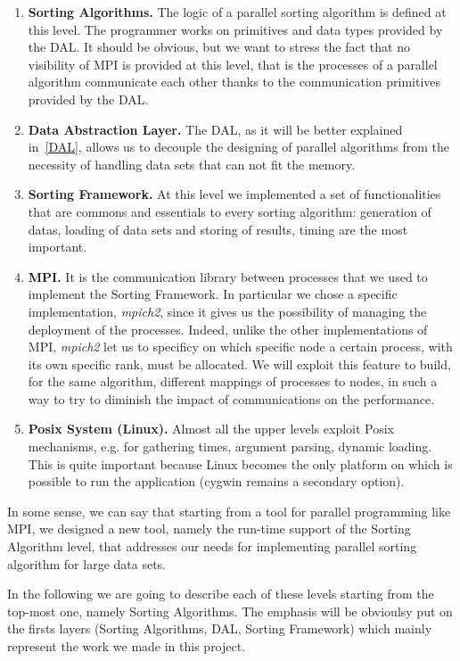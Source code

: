 \begin{enumerate}
\item \textbf{Sorting Algorithms.} The logic of a parallel sorting algorithm is defined at this level. The programmer works on primitives and data types provided by the DAL. It should be obvious, but we want to stress the fact that no visibility of MPI is provided at this level, that is the processes of a parallel algorithm communicate each other thanks to the communication primitives provided by the DAL.  
\item \textbf{Data Abstraction Layer.} The DAL, as it will be better explained in~\ref{DAL}, allows us to decouple the designing of parallel algorithms from the necessity of handling data sets that can not fit the memory. 
\item \textbf{Sorting Framework.} At this level we implemented a set of functionalities that are commons and essentials to every sorting algorithm: generation of datas, loading of data sets and storing of results, timing are the most important. 
\item \textbf{MPI.} It is the communication library between processes that we used to implement the Sorting Framework. In particular we chose a specific implementation, \textit{mpich2}, since it gives us the possibility of managing the deployment of the processes. Indeed, unlike the other implementations of MPI, \textit{mpich2} let us to specificy on which specific node a certain process, with its own specific rank, must be allocated. We will exploit this feature to build, for the same algorithm, different mappings of processes to nodes, in such a way to try to diminish the impact of communications on the performance. 
\item \textbf{Posix System (Linux).} Almost all the upper levels exploit Posix mechanisms, e.g. for gathering times, argument parsing, dynamic loading. This is quite important because Linux becomes the only platform on which is possible to run the application (cygwin remains a secondary option). 
\end{enumerate}
In some sense, we can say that starting from a tool for parallel programming like MPI, we designed a new tool, namely the run-time support of the Sorting Algorithm level, that addresses our needs for implementing parallel sorting algorithm for large data sets. 

In the following we are going to describe each of these levels starting from the top-most one, namely Sorting Algorithms. The emphasis will be obvioulsy put on the firsts layers (Sorting Algorithms, DAL, Sorting Framework) which mainly represent the work we made in this project.

